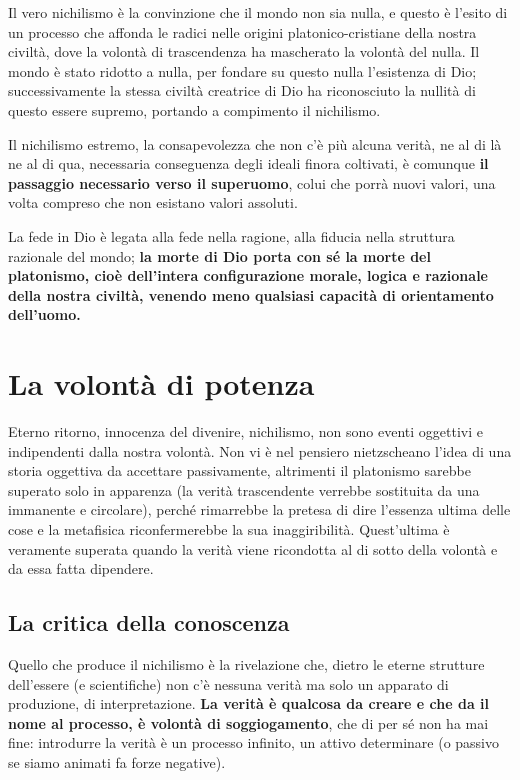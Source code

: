 Il vero nichilismo è la convinzione che il mondo non sia nulla, e questo è l'esito di un processo che affonda le radici nelle origini platonico-cristiane della nostra civiltà, dove la volontà di trascendenza ha mascherato la volontà del nulla. Il mondo è stato ridotto a nulla, per fondare su questo nulla l'esistenza di Dio; successivamente la stessa civiltà creatrice di Dio ha riconosciuto la nullità di questo essere supremo, portando a compimento il nichilismo.

Il nichilismo estremo, la consapevolezza che non c'è più alcuna verità, ne al di là ne al di qua, necessaria conseguenza degli ideali finora coltivati, è comunque \textbf{il passaggio necessario verso il superuomo}, colui che porrà nuovi valori, una volta compreso che non esistano valori assoluti.

La fede in Dio è legata alla fede nella ragione, alla fiducia nella struttura razionale del mondo; \textbf{la morte di Dio porta con sé la morte del platonismo, cioè dell'intera configurazione morale, logica e razionale della nostra civiltà, venendo meno qualsiasi capacità di orientamento dell'uomo.}

\section{La volontà di potenza}

Eterno ritorno, innocenza del divenire, nichilismo, non sono eventi oggettivi e indipendenti dalla nostra volontà. Non vi è nel pensiero nietzscheano l'idea di una storia oggettiva da accettare passivamente, altrimenti il platonismo sarebbe superato solo in apparenza (la verità trascendente verrebbe sostituita da una immanente e circolare), perché rimarrebbe la pretesa di dire l'essenza ultima delle cose e la metafisica riconfermerebbe la sua inaggiribilità. Quest'ultima è veramente superata quando la verità viene ricondotta al di sotto della volontà e da essa fatta dipendere.

\subsection{La critica della conoscenza}

Quello che produce il nichilismo è la rivelazione che, dietro le eterne strutture dell'essere (e scientifiche) non c'è nessuna verità ma solo un apparato di produzione, di interpretazione. \textbf{La verità è qualcosa da creare e che da il nome al processo, è volontà di soggiogamento}, che di per sé non ha mai fine: introdurre la verità è un processo infinito, un attivo determinare (o passivo se siamo animati fa forze negative).

